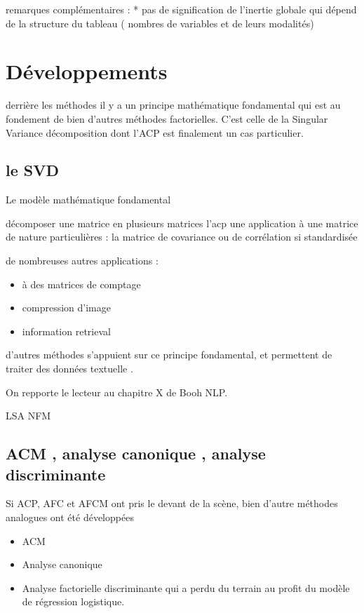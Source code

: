 \documentclass[
]{book}
\providecommand{\tightlist}{%
  \setlength{\itemsep}{0pt}\setlength{\parskip}{0pt}}
\begin{document}
remarques complémentaires :
* pas de signification de l'inertie globale qui dépend de la structure du tableau ( nombres de variables et de leurs modalités)

\hypertarget{duxe9veloppements}{%
\section{Développements}\label{duxe9veloppements}}

derrière les méthodes il y a un principe mathématique fondamental qui est au fondement de bien d'autres méthodes factorielles. C'est celle de la Singular Variance décomposition dont l'ACP est finalement un cas particulier.

\hypertarget{le-svd}{%
\subsection{le SVD}\label{le-svd}}

Le modèle mathématique fondamental

décomposer une matrice en plusieurs matrices
l'acp une application à une matrice de nature particulières : la matrice de covariance ou de corrélation si standardisée

de nombreuses autres applications :

\begin{itemize}
\tightlist
\item
  à des matrices de comptage
\item
  compression d'image
\item
  information retrieval
\end{itemize}

d'autres méthodes s'appuient sur ce principe fondamental, et permettent de traiter des données textuelle .

On repporte le lecteur au chapitre X de Booh NLP.

LSA
NFM

\hypertarget{acm-analyse-canonique-analyse-discriminante}{%
\subsection{ACM , analyse canonique , analyse discriminante}\label{acm-analyse-canonique-analyse-discriminante}}

Si ACP, AFC et AFCM ont pris le devant de la scène, bien d'autre méthodes analogues ont été développées

\begin{itemize}
\tightlist
\item
  ACM
\item
  Analyse canonique
\item
  Analyse factorielle discriminante qui a perdu du terrain au profit du modèle de régression logistique.
\end{itemize}
\end{document}
